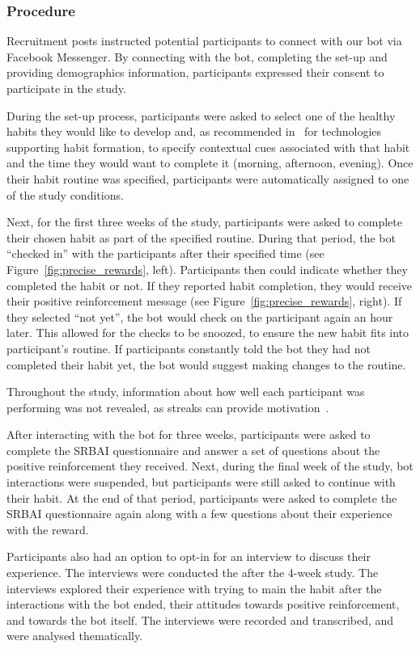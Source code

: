 \documentclass{scaffold/sigchi}
\begin{document}
\subsubsection{Procedure}
Recruitment posts instructed potential participants to connect with our bot via Facebook Messenger. By connecting with the bot, completing the set-up and providing demographics information, participants expressed their consent to participate in the study.

During the set-up process, participants were asked to select one of the healthy habits they would like to develop and, as recommended in~\cite{article_dont_forget_your_pill} for technologies supporting habit formation, to specify contextual cues associated with that habit and the time they would want to complete it (morning, afternoon, evening). Once their habit routine was specified, participants were automatically assigned to one of the study conditions. 

Next, for the first three weeks of the study, participants were asked to complete their chosen habit as part of the specified routine. During that period, the bot ``checked in'' with the participants after their specified time (see Figure~\ref{fig:precise_rewards}, left). Participants then could indicate whether they completed the habit or not. If they reported habit completion, they would receive their positive reinforcement message (see Figure~\ref{fig:precise_rewards}, right). If they selected ``not yet'', the bot would check on the participant again an hour later. This allowed for the checks to be snoozed, to ensure the new habit fits into participant's routine. If participants constantly told the bot they had not completed their habit yet, the bot would suggest making changes to the routine.

Throughout the study, information about how well each participant was performing was not revealed, as streaks can provide motivation~\cite{article_dont_kick_habit}. 

After interacting with the bot for three weeks, participants were asked to complete the SRBAI questionnaire and answer a set of questions about the positive reinforcement they received. Next, during the final week of the study, bot interactions were suspended, but participants were still asked to continue with their habit. At the end of that period, participants were asked to complete the SRBAI questionnaire again along with a few questions about their experience with the reward. 

Participants also had an option to opt-in for an interview to discuss their experience. The interviews were conducted the after the 4-week study. The interviews explored their experience with trying to main the habit after the interactions with the bot ended, their attitudes towards positive reinforcement, and towards the bot itself. The interviews were recorded and transcribed, and were analysed thematically\cite{thematic_analysis_qualatitive_data}. 
\end{document}
